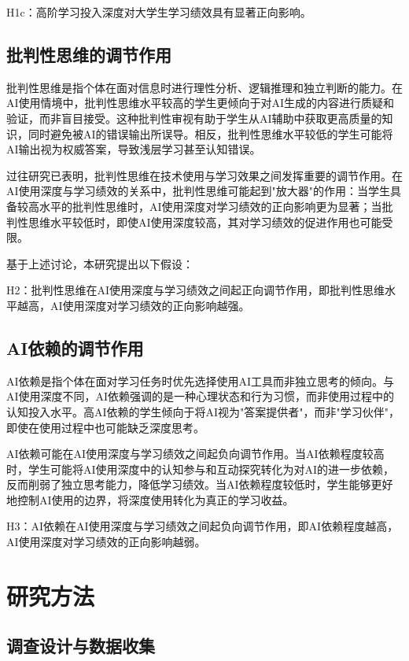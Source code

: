 \documentclass{njtech-thesis}
\begin{document}
H1c：高阶学习投入深度对大学生学习绩效具有显著正向影响。

\subsection{批判性思维的调节作用}

批判性思维是指个体在面对信息时进行理性分析、逻辑推理和独立判断的能力。在AI使用情境中，批判性思维水平较高的学生更倾向于对AI生成的内容进行质疑和验证，而非盲目接受。这种批判性审视有助于学生从AI辅助中获取更高质量的知识，同时避免被AI的错误输出所误导。相反，批判性思维水平较低的学生可能将AI输出视为权威答案，导致浅层学习甚至认知错误。

过往研究已表明，批判性思维在技术使用与学习效果之间发挥重要的调节作用。在AI使用深度与学习绩效的关系中，批判性思维可能起到"放大器"的作用：当学生具备较高水平的批判性思维时，AI使用深度对学习绩效的正向影响更为显著；当批判性思维水平较低时，即使AI使用深度较高，其对学习绩效的促进作用也可能受限。

基于上述讨论，本研究提出以下假设：

H2：批判性思维在AI使用深度与学习绩效之间起正向调节作用，即批判性思维水平越高，AI使用深度对学习绩效的正向影响越强。

\subsection{AI依赖的调节作用}

AI依赖是指个体在面对学习任务时优先选择使用AI工具而非独立思考的倾向。与AI使用深度不同，AI依赖强调的是一种心理状态和行为习惯，而非使用过程中的认知投入水平。高AI依赖的学生倾向于将AI视为"答案提供者"，而非"学习伙伴"，即使在使用过程中也可能缺乏深度思考。

AI依赖可能在AI使用深度与学习绩效之间起负向调节作用。当AI依赖程度较高时，学生可能将AI使用深度中的认知参与和互动探究转化为对AI的进一步依赖，反而削弱了独立思考能力，降低学习绩效。当AI依赖程度较低时，学生能够更好地控制AI使用的边界，将深度使用转化为真正的学习收益。

H3：AI依赖在AI使用深度与学习绩效之间起负向调节作用，即AI依赖程度越高，AI使用深度对学习绩效的正向影响越弱。

\section{研究方法}

\subsection{调查设计与数据收集}
\end{document}
